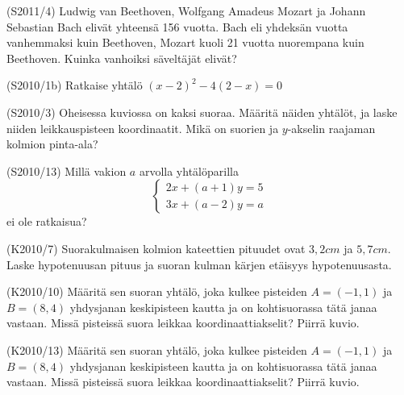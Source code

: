 \begin{tehtava}  (S2011/4)
Ludwig van Beethoven, Wolfgang Amadeus Mozart ja Johann Sebastian Bach elivät yhteensä 156 vuotta. Bach eli yhdeksän vuotta vanhemmaksi kuin Beethoven, Mozart kuoli 21 vuotta nuorempana kuin Beethoven. Kuinka vanhoiksi säveltäjät elivät?
\end{tehtava}

\begin{tehtava}  (S2010/1b)
Ratkaise yhtälö $(x-2)^2-4(2-x)=0$
\end{tehtava}

\begin{tehtava}  (S2010/3)
Oheisessa kuviossa on kaksi suoraa. Määritä näiden yhtälöt, ja laske niiden leikkauspisteen koordinaatit. Mikä on suorien ja $y$-akselin raajaman kolmion pinta-ala?
\end{tehtava}


\begin{tehtava}  (S2010/13)
Millä vakion $a$ arvolla yhtälöparilla 
\[
\left\{
\begin{aligned}
 2x+(a+1)y=5  \\
 3x+(a-2)y=a  
\end{aligned}
\right. 
\]
ei ole ratkaisua?
\end{tehtava}

\begin{tehtava}  (K2010/7)
Suorakulmaisen kolmion kateettien pituudet ovat $3,2 cm$ ja $5,7 cm$. Laske hypotenuusan pituus ja suoran kulman kärjen etäisyys hypotenuusasta.
\end{tehtava}

\begin{tehtava}  (K2010/10)
Määritä sen suoran yhtälö, joka kulkee pisteiden $A=(-1,1)$ ja $B=(8,4)$ yhdysjanan keskipisteen kautta ja on kohtisuorassa tätä janaa vastaan. Missä pisteissä suora leikkaa koordinaattiakselit? Piirrä kuvio.
\end{tehtava}

\begin{tehtava}  (K2010/13)
Määritä sen suoran yhtälö, joka kulkee pisteiden $A=(-1,1)$ ja $B=(8,4)$ yhdysjanan keskipisteen kautta ja on kohtisuorassa tätä janaa vastaan. Missä pisteissä suora leikkaa koordinaattiakselit? Piirrä kuvio.
\end{tehtava}


